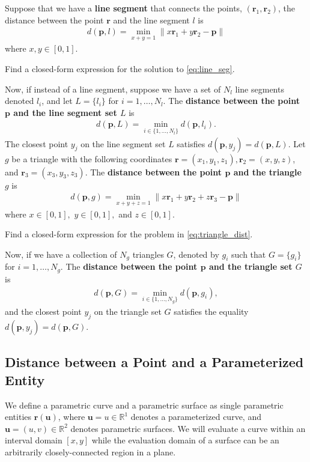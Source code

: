  Suppose that we have a \textbf{line segment} that connects the points, $(\bm{r}_1, \bm{r}_2)$, the distance between the point $\bm{r}$ and the line segment $l$ is
 \begin{align}
 	d(\bm{p}, l) = \min_{x+y=1} \|x\bm{r}_1 + y \bm{r}_2 - \bm{p} \|
 	\label{eq:line_seg}
 \end{align}
 where $x, y \in [0, 1 ]$.
 \begin{homework}
 	Find a closed-form expression for the solution to \eqref{eq:line_seg}.
 \end{homework}
%
Now, if instead of a line segment, suppose we have a set of $N_l$ line segments denoted $l_i$, and let $L=\{l_i\}$ for $i=1,\ldots,N_l$. The \textbf{distance between the point $\bm{p}$ and the line segment set $L$} is 
%
\begin{align}
	d(\bm{p}, L) = \min_{i\in \{1,\ldots, N_l\}} d(\bm{p}, l_i).
\end{align}
%
The closest point $y_j$ on the line segment set $L$ satisfies $d(\bm{p}, y_j) = d(\bm{p}, L)$.
%
Let $g$ be a triangle with the following coordinates  $\bm{r}=(x_1,y_1,z_1), \bm{r}_2 = (x, y, z)$, and $\bm{r}_3 = (x_3,y_3,z_3)$. The \textbf{distance between the point $\bm{p}$ and the triangle $g$} is 
%
\begin{align}
	d(\bm{p}, g) = \min_{x+y+z=1} \| x\bm{r}_1 + y\bm{r}_2 + z \bm{r}_3 - \bm{p} \|
	\label{eq:triangle_dist}
\end{align}
%
where $x \in [0,1], \,\, y\in [0,1],$ and $z \in [0,1]$. 
%
\begin{homework}
	Find a closed-form expression for the problem in \eqref{eq:triangle_dist}.
\end{homework}
 
 Now, if we have a collection of $N_g$ triangles $G$, denoted by $g_i$ such that $G =\{g_i\}$ for $i=1,\ldots,N_g$. The \textbf{distance between the point $\bm{p}$ and the triangle set $G$} is 
 \begin{align}
 	d(\bm{p}, G) = \min_{i\in \{1,\ldots, N_g\}} d(\bm{p}, g_i),
 \end{align}
 and the closest point $y_j$ on the triangle set $G$ satisfies the equality $d(\bm{p}, y_j) = d(\bm{p}, G)$.
 
 \subsection{Distance between a Point and a  Parameterized  Entity}
We define a parametric curve and a parametric surface as single parametric entities $\bm{r}(\bm{u})$, where $\bm{u} = u\in \mathbb{R}^1$ denotes a parameterized curve, and $\bm{u} = (u,v) \in \mathbb{R}^2$ denotes parametric surfaces. We will evaluate a curve within an interval domain \eg $[x,y]$ while the evaluation domain of a surface can be an arbitrarily closely-connected region in a plane. 

